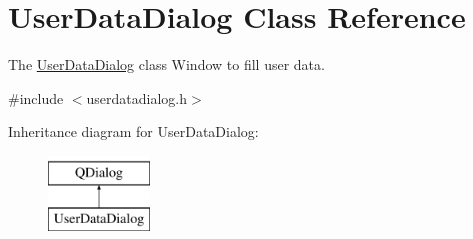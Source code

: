\hypertarget{classUserDataDialog}{\section{User\-Data\-Dialog Class Reference}
\label{classUserDataDialog}
}


The \hyperlink{classUserDataDialog}{User\-Data\-Dialog} class Window to fill user data.  




{\ttfamily \#include $<$userdatadialog.\-h$>$}

Inheritance diagram for User\-Data\-Dialog\-:\begin{figure}[H]
\begin{center}
\leavevmode
\includegraphics[height=2.000000cm]{de/d9c/classUserDataDialog}
\end{center}
\end{figure}

